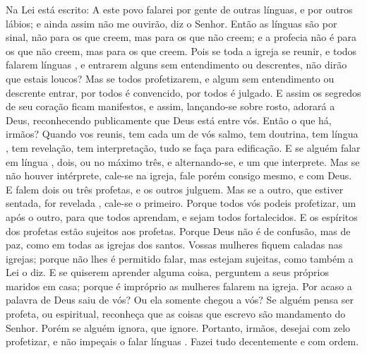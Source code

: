 {Na Lei está escrito: A este povo falarei por gente de outras línguas, e por outros lábios; e ainda assim não me ouvirão, diz o Senhor.
Então as línguas
{} são por sinal, não para os que creem, mas para os que não creem; e a profecia não é para os que não creem, mas para os que creem.
Pois se toda a igreja se reunir, e todos falarem línguas
{} , e entrarem alguns sem entendimento ou descrentes, não dirão que estais loucos?
Mas se todos profetizarem, e algum sem entendimento ou descrente entrar, por todos é convencido,
{} por todos é julgado.
E assim os segredos de seu coração ficam manifestos, e assim, lançando-se sobre
{} rosto, adorará a Deus, reconhecendo publicamente que Deus está entre vós.
Então o que há, irmãos? Quando vos reunis, tem cada um de vós salmo, tem doutrina, tem língua
{} , tem revelação, tem interpretação, tudo se faça para edificação.
E se alguém falar em língua
{} ,
{} dois, ou no máximo três, e alternando-se, e um que interprete.
Mas se não houver intérprete, cale-se na igreja, fale porém consigo mesmo, e com Deus.
E falem dois ou três profetas, e os outros julguem.
Mas se a outro, que estiver sentada, for revelada
{} , cale-se o primeiro.
Porque todos vós podeis profetizar, um após o outro, para que todos aprendam, e sejam todos fortalecidos.
E os espíritos dos profetas estão sujeitos aos profetas.
Porque Deus não é de confusão, mas de paz, como em todas as igrejas dos santos.
Vossas mulheres fiquem caladas nas igrejas; porque não lhes é permitido falar, mas
{} estejam sujeitas, como também a Lei o diz.
E se quiserem aprender alguma coisa, perguntem a seus próprios maridos em casa; porque é impróprio as mulheres falarem na igreja.
Por acaso a palavra de Deus saiu de vós? Ou ela somente chegou a vós?
Se alguém pensa ser profeta, ou espiritual, reconheça que as coisas que escrevo são mandamento do Senhor.
Porém se alguém ignora, que ignore.
Portanto, irmãos, desejai com zelo profetizar, e não impeçais o falar línguas
{} .
Fazei tudo decentemente e com ordem.

}
